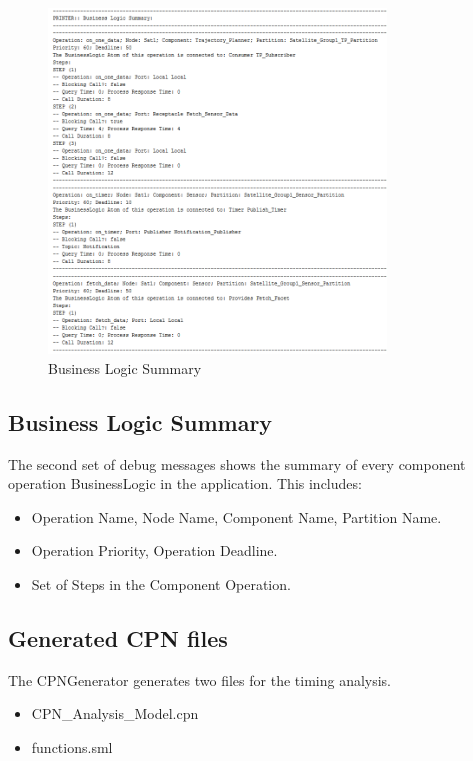 \begin{figure}[ht]
\centering
\includegraphics[width=0.8\textwidth]{./figs/app_summary_2}
\caption{Business Logic Summary}
\label{fig:app_summary_2}
\vspace{-0.2in}
\end{figure}
\vspace{0.1in} 

\subsection{Business Logic Summary}
The second set of debug messages shows the summary of every component operation BusinessLogic in the application. This includes: 
\begin{itemize}
\item Operation Name, Node Name, Component Name, Partition Name.
\item Operation Priority, Operation Deadline.
\item Set of Steps in the Component Operation.
\end{itemize}

\newpage

\subsection{Generated CPN files}

The CPNGenerator generates two files for the timing analysis. 
\begin{itemize}
\item CPN\_Analysis\_Model.cpn
\item functions.sml
\end{itemize}

